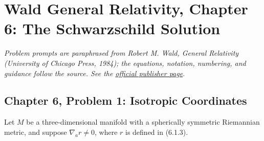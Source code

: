 \section{Wald General Relativity, Chapter 6: The Schwarzschild Solution}

\noindent\textit{Problem prompts are paraphrased from Robert M. Wald,
\emph{General Relativity} (University of Chicago Press, 1984); the equations,
notation, numbering, and guidance follow the source. See the
\href{https://press.uchicago.edu/ucp/books/book/chicago/G/bo5952261.html}{official publisher page}.}

\subsection{Chapter 6, Problem 1: Isotropic Coordinates}

Let $M$ be a three-dimensional manifold with a spherically symmetric Riemannian
metric, and suppose $\nabla_a r\neq0$, where $r$ is defined in (6.1.3).

